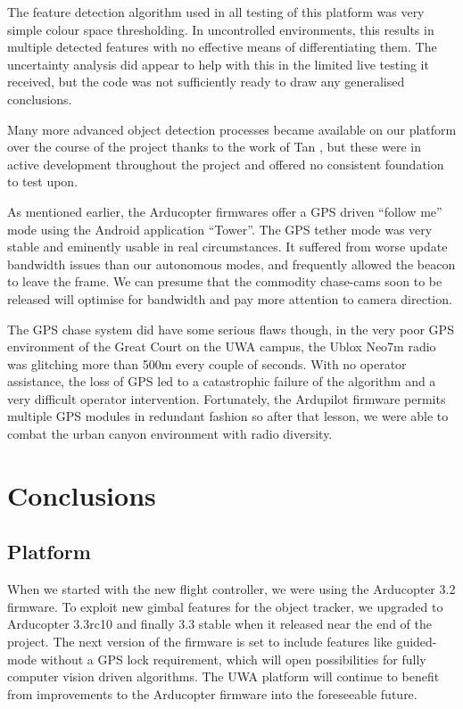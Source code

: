\documentclass{article}
\newcounter{subsubsubsection}[subsubsection]
\begin{document}
        The feature detection algorithm used in all testing of this platform was very simple colour space thresholding.  In uncontrolled environments, this results in multiple detected features with no effective means of differentiating them.  The uncertainty analysis did appear to help with this in the limited live testing it received, but the code was not sufficiently ready to draw any generalised conclusions.

        Many more advanced object detection processes became available on our platform over the course of the project thanks to the work of Tan \cite{Tan}, but these were in active development throughout the project and offered no consistent foundation to test upon.

        As mentioned earlier, the Arducopter firmwares offer a GPS driven ``follow me'' mode using the Android application ``Tower''. %
        The GPS tether mode was very stable and eminently usable in real circumstances.  It suffered from worse update bandwidth issues than our autonomous modes, and frequently allowed the beacon to leave the frame.  We can presume that the commodity chase-cams soon to be released will optimise for bandwidth and pay more attention to camera direction.

        The GPS chase system did have some serious flaws though, in the very poor GPS environment of the Great Court on the UWA campus, the Ublox Neo7m radio was glitching more than 500m every couple of seconds.  With no operator assistance, the loss of GPS led to a catastrophic failure of the algorithm and a very difficult operator intervention.  Fortunately, the Ardupilot firmware permits multiple GPS modules in redundant fashion so after that lesson, we were able to combat the urban canyon environment with radio diversity.

\section{Conclusions}

  \subsection{Platform}

    When we started with the new flight controller, we were using the Arducopter 3.2 firmware. To exploit new gimbal features for the object tracker, we upgraded to Arducopter 3.3rc10 and finally 3.3 stable when it released near the end of the project.  The next version of the firmware is set to include features like guided-mode without a GPS lock requirement, which will open possibilities for fully computer vision driven algorithms.  The UWA platform will continue to benefit from improvements to the Arducopter firmware into the foreseeable future.
\end{document}
